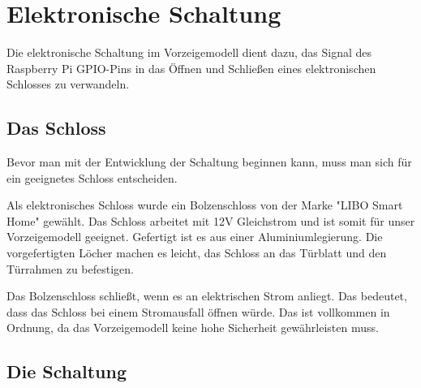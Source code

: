 \chapter{Elektronische Schaltung}
Die elektronische Schaltung im Vorzeigemodell dient dazu, das Signal
des Raspberry Pi GPIO-Pins in das Öffnen und Schließen eines elektronischen Schlosses
zu verwandeln.

\section{Das Schloss}
Bevor man mit der Entwicklung der Schaltung beginnen kann, muss man sich für ein geeignetes
Schloss entscheiden.

Als elektronisches Schloss wurde ein Bolzenschloss von der Marke "LIBO Smart Home" gewählt.
Das Schloss arbeitet mit 12V Gleichstrom und ist somit für unser Vorzeigemodell geeignet. Gefertigt
ist es aus einer Aluminiumlegierung. Die vorgefertigten Löcher machen es leicht, das Schloss an das
Türblatt und den Türrahmen zu befestigen.

Das Bolzenschloss schließt, wenn es an elektrischen Strom anliegt. Das bedeutet, dass das Schloss
bei einem Stromausfall öffnen würde. Das ist vollkommen in Ordnung, da das Vorzeigemodell
keine hohe Sicherheit gewährleisten muss.

\section{Die Schaltung}
